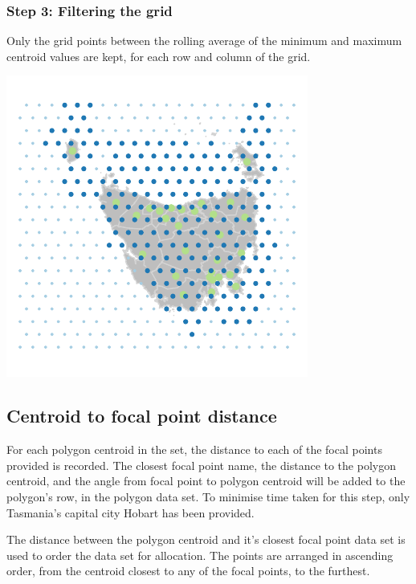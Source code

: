 \hypertarget{step-3-filtering-the-grid}{%
\subsubsection{Step 3: Filtering the
grid}\label{step-3-filtering-the-grid}}

Only the grid points between the rolling average of the minimum and
maximum centroid values are kept, for each row and column of the grid.

\begin{Schunk}

\includegraphics{algorithmRjournal_files/figure-latex/filter_grid-1} \end{Schunk}

\hypertarget{centroid-to-focal-point-distance}{%
\subsection{Centroid to focal point
distance}\label{centroid-to-focal-point-distance}}

For each polygon centroid in the set, the distance to each of the focal
points provided is recorded. The closest focal point name, the distance
to the polygon centroid, and the angle from focal point to polygon
centroid will be added to the polygon's row, in the polygon data set. To
minimise time taken for this step, only Tasmania's capital city Hobart
has been provided.

The distance between the polygon centroid and it's closest focal point
data set is used to order the data set for allocation. The points are
arranged in ascending order, from the centroid closest to any of the
focal points, to the furthest.

